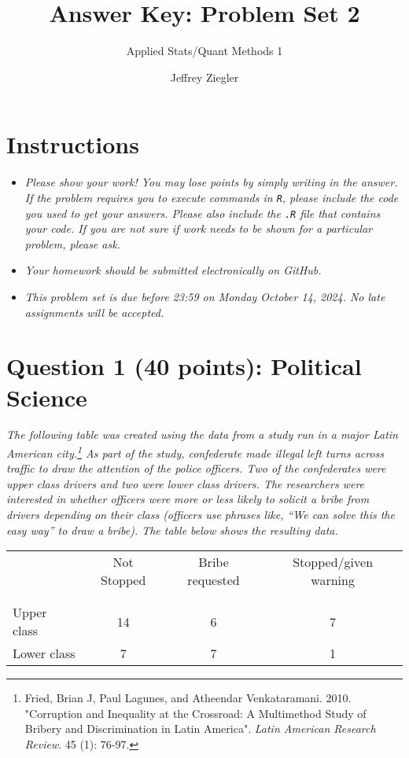 \documentclass[12pt,letterpaper]{article}
\title{Answer Key: Problem Set 2}
\date{Jeffrey Ziegler}
\author{Applied Stats/Quant Methods 1}
\begin{document}
	\maketitle
	
	\section*{Instructions}
	\begin{itemize}
	\item \textit{Please show your work! You may lose points by simply writing in the answer. If the problem requires you to execute commands in \texttt{R}, please include the code you used to get your answers. Please also include the \texttt{.R} file that contains your code. If you are not sure if work needs to be shown for a particular problem, please ask.}
	\item \textit{Your homework should be submitted electronically on GitHub.}
	\item \textit{This problem set is due before 23:59 on Monday October 14, 2024. No late assignments will be accepted.}
	\end{itemize}
	
	\vspace{.5cm}
	\section*{Question 1 (40 points): Political Science}
		\vspace{.25cm}
\textit{The following table was created using the data from a study run in a major Latin American city.\footnote{Fried, Brian J, Paul Lagunes, and Atheendar Venkataramani. 2010. "Corruption and Inequality at the Crossroad: A Multimethod Study of Bribery and Discrimination in Latin America". \textit{Latin American Research Review}. 45 (1): 76-97.} As part of the study, confederate made illegal left turns across traffic to draw the attention of the police officers.  Two of the confederates were upper class drivers and two were lower class drivers.  The researchers were interested in whether officers were more or less likely to solicit a bribe from drivers depending on their class (officers use phrases like, ``We can solve this the easy way'' to draw a bribe).  The table below shows the resulting data.}

\begin{table}[h!]
	\centering
	\begin{adjustbox}{max width=.75\textwidth}
		\begin{tabular}{l | c c c }
			& Not Stopped & Bribe requested & Stopped/given warning \\
			\\[-1.8ex] 
			\hline \\[-1.8ex]
			Upper class & 14 & 6 & 7 \\
			Lower class & 7 & 7 & 1 \\
			\hline
		\end{tabular}
	\end{adjustbox}
\end{table}
\end{document}
